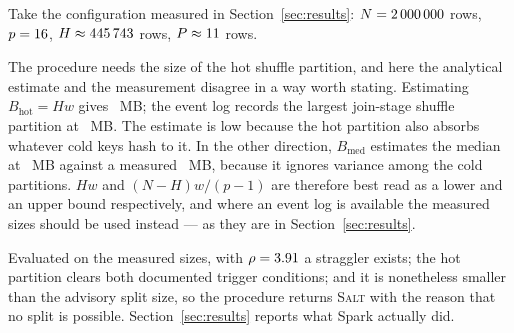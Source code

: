 Take the configuration measured in Section~\ref{sec:results}: $N=2\,000\,000$ rows,
$p=16$, $H\approx445\,743$ rows, $P\approx11$ rows.

The procedure needs the size of the hot shuffle partition, and here the
analytical estimate and the measurement disagree in a way worth stating.
Estimating $B_{\text{hot}} = Hw$ gives \HOTMB~MB; the event log records the
largest join-stage shuffle partition at \MeasHotMB~MB. The estimate is low
because the hot partition also absorbs whatever cold keys hash to it. In the
other direction, $B_{\text{med}}$ estimates the median at \THRESHMB~MB against
a measured \MeasMedMB~MB, because it ignores variance among the cold
partitions. $Hw$ and $(N-H)w/(p-1)$ are therefore best read as a lower and an
upper bound respectively, and where an event log is available the measured
sizes should be used instead --- as they are in Section~\ref{sec:results}.

Evaluated on the measured sizes, with $\rho=3.91$ a straggler exists; the
hot partition clears both documented trigger conditions; and it is nonetheless
smaller than the advisory split size, so the procedure returns \textsc{Salt}
with the reason that no split is possible. Section~\ref{sec:results} reports
what Spark actually did.
